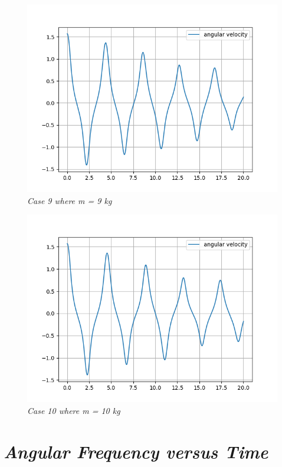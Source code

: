         \begin{figure}[H]
            \centering
            \includegraphics{Appendix/RSimPictures/A/am9.png}
            \caption{\textit{Case 9 where m = 9 kg}}
            \label{}
        \end{figure}
            
        \begin{figure}[H]
            \centering
            \includegraphics{Appendix/RSimPictures/A/am10.png}
            \caption{\textit{Case 10 where m = 10 kg}}
            \label{}
        \end{figure}
            
    \section{\textit{Angular Frequency versus Time}}
            
